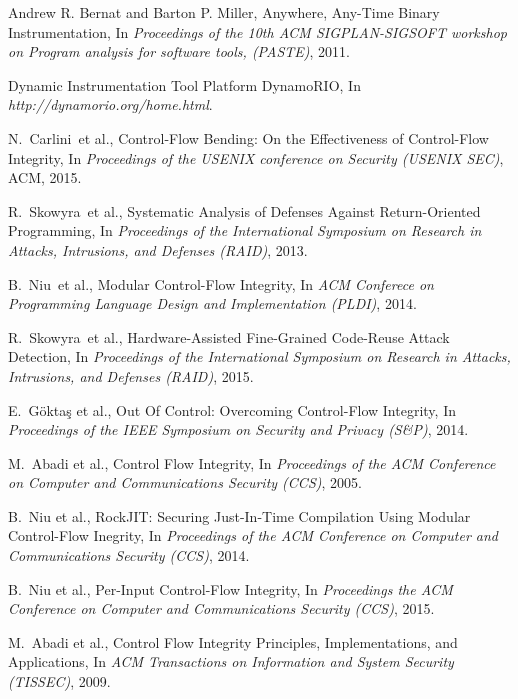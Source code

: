 \documentclass[11pt,a4paper,bibtotoc,idxtotoc,headsepline,footsepline,footexclude,BCOR20mm,DIV10]{scrbook}
\begin{document}
\begin{thebibliography}{50}
Andrew R. Bernat and Barton P. Miller,
{Anywhere, Any-Time Binary Instrumentation}, 
In \emph{Proceedings of the 10th ACM SIGPLAN-SIGSOFT workshop on Program analysis for software tools, (PASTE)}, 2011.

Dynamic Instrumentation Tool Platform
{DynamoRIO}, 
In \emph{http://dynamorio.org/home.html}.





N.~Carlini~et al., {Control-Flow Bending: On the Effectiveness of Control-Flow Integrity}, In
\emph{Proceedings of the USENIX conference on Security (USENIX SEC)}, ACM, 2015.

R.~Skowyra~et al., {Systematic Analysis of Defenses Against Return-Oriented Programming}, In
\emph{Proceedings of the International Symposium on Research in Attacks, Intrusions, and Defenses (RAID)}, 2013.

B.~Niu~et al., {Modular Control-Flow Integrity}, In
\emph{ACM Conferece on Programming Language Design and Implementation (PLDI)}, 2014.

R.~Skowyra~et al., {Hardware-Assisted Fine-Grained Code-Reuse Attack Detection}, In
\emph{Proceedings of the International Symposium on Research in Attacks, Intrusions, and Defenses (RAID)}, 2015.

E.~G\"{o}kta\c{s} et al., {Out Of Control: Overcoming Control-Flow Integrity}, In
\emph{Proceedings of the IEEE Symposium on Security and Privacy (S\&P)}, 2014.

M.~Abadi et al., {Control Flow Integrity}, In
\emph{Proceedings of the ACM Conference on Computer and Communications Security (CCS)}, 2005.

B.~Niu et al., {RockJIT: Securing Just-In-Time Compilation Using Modular Control-Flow Inegrity}, In
\emph{Proceedings of the ACM Conference on Computer and Communications Security (CCS)}, 2014.

B.~Niu et al., {Per-Input Control-Flow Integrity}, In
\emph{Proceedings the ACM Conference on Computer and Communications Security (CCS)}, 2015.

M.~Abadi et al., {Control Flow Integrity Principles, Implementations, and Applications}, In
\emph{ACM Transactions on Information and System Security (TISSEC)}, 2009.


\end{thebibliography}
\end{document}

